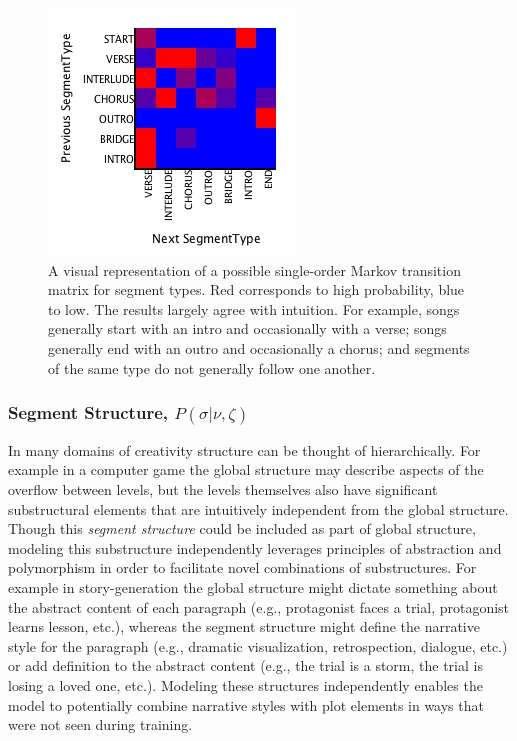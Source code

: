 \documentclass[letterpaper]{article}
\begin{document}
\begin{figure}[t]
	\centering
	\includegraphics[width=\linewidth]{segment_transitions}
	\caption{\label{fig:segment_transitions} A visual representation of a possible single-order Markov transition matrix for segment types. Red corresponds to high probability, blue to low. The results largely agree with intuition. For example, songs generally start with an intro and occasionally with a verse; songs generally end with an outro and occasionally a chorus; and segments of the same type do not generally follow one another.}
\end{figure}

\subsubsection{Segment Structure, $P(\sigma|\nu,\zeta)$}

In many domains of creativity structure can be thought of hierarchically. For example in a computer game the global structure may describe aspects of the overflow between levels, but the levels themselves also have significant substructural elements that are intuitively independent from the global structure. Though this \emph{segment structure} could be included as part of global structure, modeling this substructure independently leverages principles of abstraction and polymorphism in order to facilitate novel combinations of substructures. For example in story-generation the global structure might dictate something about the abstract content of each paragraph (e.g., protagonist faces a trial, protagonist learns lesson, etc.), whereas the segment structure might define the narrative style for the paragraph (e.g., dramatic visualization, retrospection, dialogue, etc.) or add definition to the abstract content (e.g., the trial is a storm, the trial is losing a loved one, etc.). Modeling these structures independently enables the model to potentially combine narrative styles with plot elements in ways that were not seen during training.
\end{document}
